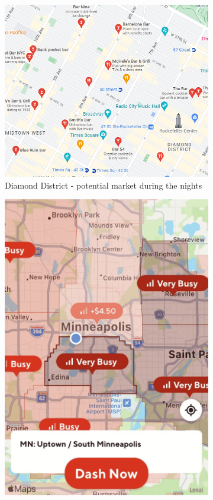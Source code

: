 \documentclass[11pt]{article}
\begin{document}
\begin{figure}[ht]
    \centering
    \begin{subfigure}[b]{0.4\textwidth}
        \includegraphics[width=\textwidth]{plots/diamond.png}
        \caption{Diamond District - potential market during the nights}
        \label{fig:potential market}
    \end{subfigure}
    \hfill
    \begin{subfigure}[b]{0.3\textwidth}
    \centering
        \includegraphics[width=\textwidth]{plots/financial partner.png}

\end{subfigure}
\end{figure}
\end{document}
